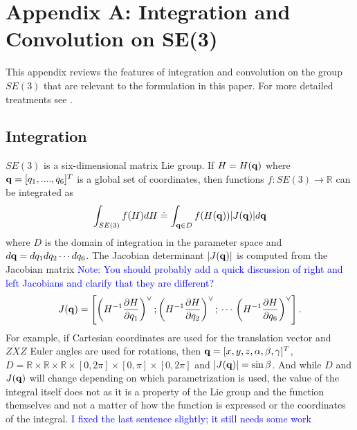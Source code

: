 \documentclass[twocolumn,10pt]{asme2ej}
\begin{document}
%
\appendix       %
\section*{Appendix A: Integration and Convolution on SE(3)}

This appendix reviews the features of integration and convolution on the group $SE(3)$ that are
relevant to the formulation in this paper. For more detailed treatments see \cite{myoldbook, vol2}.

\subsection*{Integration}

$SE(3)$ is a six-dimensional matrix Lie group. If $H = H({\bf q})$ where ${\bf q} = [q_1,....,q_6]^T$ is a global set of coordinates, then
functions $f:SE(3) \rightarrow \mathbb{R}$ can be integrated as
$$ \int_{SE(3)} f(H) dH \doteq \int_{{\bf q} \in D} f(H({\bf q})) |J({\bf q})| d{\bf q} $$
where $D$ is the domain of integration in the parameter space and $d{\bf q} = dq_1 dq_2 \cdots dq_6$. 
The Jacobian determinant $|J({\bf q})|$ is computed from the Jacobian matrix \textcolor{blue}{Note: You should probably add a quick discussion of right and left Jacobians and clarify that they are different?}
$$ J({\bf q}) = \left[\left(H^{-1} \frac{\partial H}{\partial q_1}\right)^{\vee}; \left(H^{-1} \frac{\partial H}{\partial q_2}\right)^{\vee};\,\cdots\,
\left(H^{-1} \frac{\partial H}{\partial q_6}\right)^{\vee}\right]. $$
For example, if Cartesian coordinates are used for the translation vector and $ZXZ$ Euler angles are used
for rotations, then ${\bf q} = [x,y,z,\alpha,\beta,\gamma]^T$, $D=\mathbb{R}\times\mathbb{R}\times\mathbb{R}\times[0,2\pi]\times[0,\pi]\times[0,2\pi]$ and $|J({\bf q})| = \sin \beta$. And while $D$ and $J({\bf q})$ will change depending on which parametrization is used, the value of the integral itself does not as it is a property of the Lie group and the function themselves and not a matter of how the function is expressed or the coordinates of the integral.
\textcolor{blue}{I fixed the last sentence slightly; it still needs some work}
\end{document}
